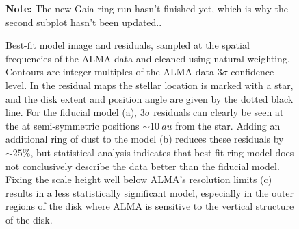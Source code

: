 \documentclass[modern]{aastex62}
\begin{document}
\begin{figure}
  \centering
  
  \qquad
    
  \qquad

  \qquad
    
  \caption{Best-fit model image and residuals, sampled at the spatial frequencies of the ALMA data and cleaned using natural weighting. 
  Contours are integer multiples of the ALMA data $3\sigma$ confidence level. 
  In the residual maps the stellar location is marked with a star, and the disk extent and position angle are given by the dotted black line.
  For the fiducial model (a), $3\sigma$ residuals can clearly be seen at the at semi-symmetric positions $\sim \SI{10}{au}$ from the star. 
  Adding an additional ring of dust to the model (b) reduces these residuals by $\sim 25 \%$, but statistical analysis indicates that best-fit ring model does not conclusively describe the data better than the fiducial model.
  Fixing the scale height well below ALMA's resolution limits (c) results in a less statistically significant model, especially in the outer regions of the disk where ALMA is sensitive to the vertical structure of the disk.}
  \textbf{Note:} The new Gaia ring run hasn't finished yet, which is why the second subplot hasn't been updated..
\end{figure}
\end{document}
